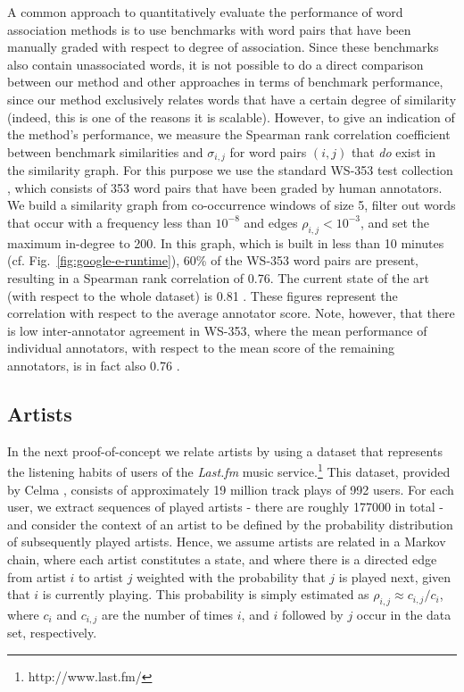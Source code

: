 \documentclass[conference]{IEEEtran}
\newcommand{\rn}[1]{\rho_{#1}}
\newcommand{\sy}[1]{\sigma_{#1}}
\begin{document}
A common approach to quantitatively evaluate the performance of word association methods is to use benchmarks
with word pairs that have been manually graded with respect to degree of association. Since these
benchmarks also contain unassociated words, it is not possible to do a direct comparison between our
method and other
approaches in terms of benchmark performance, since our method exclusively relates words that have a certain
degree of similarity (indeed, this is one of the reasons it is scalable). However, to give an indication of
the method's performance, we measure the Spearman rank correlation coefficient between benchmark
similarities and $\sy{i,j}$ for word pairs $(i, j)$ that \emph{do} exist in the similarity graph. For this purpose we
use the standard WS-353 test collection \cite{Finkelstein01}, which consists of 353 word pairs that have
been graded by human annotators. We build a similarity graph from co-occurrence windows of size 5, filter
out words that occur with a frequency less than $10^{-8}$ and edges $\rn{i,j} < 10^{-3}$, and
set the maximum in-degree to 200. In this graph, which is built in less than 10 minutes (cf. Fig.\ \ref{fig:google-e-runtime}),
60\% of the WS-353 word pairs are present, resulting in a Spearman rank correlation of 0.76. The current state of the
art (with respect to the whole dataset) is 0.81 \cite{Halawi12,Yih12}.
These figures represent the correlation with respect to the average annotator score. Note, however,
that there is low inter-annotator agreement in WS-353, where the mean performance
of individual annotators, with respect to the mean score of the remaining annotators, is in fact also 0.76 \cite{Hill14}.

\subsection{Artists}
In the next proof-of-concept we relate artists by using a dataset that represents the listening
habits of users of the \emph{Last.fm} music service.\footnote{http://www.last.fm/} This dataset, provided by Celma
\cite{Celma2010}, consists of approximately 19 million track plays of 992 users. For each user, we extract sequences of
played artists - there are roughly 177000 in total - and consider the context of an artist to be defined by the probability
distribution of subsequently played artists. Hence, we assume artists are related in a Markov chain, where each artist
constitutes a state, and where there is a directed edge from artist $i$ to artist $j$ weighted with the probability
that $j$ is played next, given that $i$ is currently playing. This probability is simply estimated as $\rn{i,j} \approx
c_{i,j}/c_i$, where $c_i$ and $c_{i,j}$ are the number of times $i$, and $i$ followed by $j$ occur in the data set,
respectively.
\end{document}
